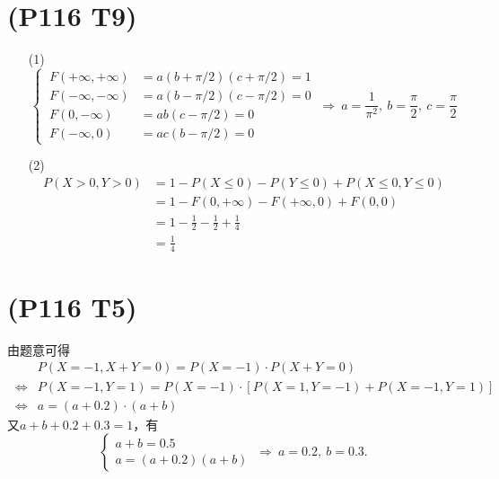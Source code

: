 \documentclass{article}
\begin{document}
\section{(P116 T9)}  %
\begin{enumerate}
    \item [(1)]
    \[
        \begin{cases}
            \ F(+\infty, +\infty) & = a(b+ \pi /2) (c+ \pi /2) = 1\\
            \ F(-\infty, -\infty) & = a(b- \pi /2) (c- \pi /2) = 0\\
            \ F(0, -\infty) & = ab (c- \pi /2) = 0\\
            \ F(-\infty, 0) & = ac (b- \pi /2) = 0
        \end{cases}   
        \ \Rightarrow\ 
            a = \displaystyle{\frac{1}{\pi ^ 2}},\ 
            b = \displaystyle{\frac{\pi}{2}},\ 
            c = \displaystyle{\frac{\pi}{2}}
    \]
    \item [(2)]
    \[
        \begin{aligned}
            P(X>0, Y>0)
            & =
            1 - P(X\leq 0) -P(Y\leq 0) + P(X\leq 0, Y\leq 0)\\
            & = 
            1 - F(0, +\infty) - F(+\infty, 0) + F(0,0)\\
            & =
            1 - \frac{1}{2} - \frac{1}{2} + \frac{1}{4}\\
            & =  
            \frac{1}{4}        
        \end{aligned}
    \]
\end{enumerate}

\section{(P116 T5)}  %
    由题意可得
    \[
        \begin{aligned}
            &P(X=-1, X+Y=0) = P(X=-1)\cdot P(X+Y=0)\\ 
            \ \Leftrightarrow&
            P(X=-1, Y=1) = P(X=-1) \cdot [P(X=1,Y=-1) + P(X=-1,Y=1)]\\
            \ \Leftrightarrow&
            a = (a+0.2) \cdot (a+b)
        \end{aligned}
    \]
    又$a+b+0.2+0.3 = 1$，有
    \[
        \begin{cases}
            a+b = 0.5 \\
            a = (a+0.2) (a+b)
        \end{cases}   
        \ \Rightarrow\ 
        a= 0.2,\ b=0.3.
    \]
\end{document}
